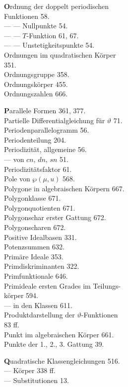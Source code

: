 
\noindent
\begin{minipage}[t]{0.48\textwidth}
\noindent \textbf{O}rdnung der doppelt periodischen\\
Funktionen 58.\\
--- --- Nullpunkte 54.\\
--- --- $T$-Funktion 61, 67.\\
--- --- Unstetigkeitspunkte 54.\\
Ordnungen im quadratischen Körper\\
351.\\
Ordnungsgruppe 358.\\
Ordnungskörper 455.\\
Ordnungszahlen 666.

\noindent \textbf{P}arallele Formen 361, 377.\\
Partielle Differentialgleichung für $\vartheta$ 71.\\
Periodenparallelogramm 56.\\
Periodenteilung 204.\\
Periodizität, allgemeine 56.\\
--- von $cn$, $dn$, $sn$ 51.\\
Periodizitätsfaktor 61.\\
Pole von $\wp(\mu,u)$ 568.\\
Polygone in algebraischen Körpern 667.\\
Polygonklasse 671.\\
Polygonquotienten 671.\\
Polygonschar erster Gattung 672.\\
Polygonscharen 672.\\
Positive Idealbasen 331.\\
Potenzsummen 632.\\
Primäre Ideale 353.\\
Primdiskriminanten 322.\\
Primfunktionale 646.\\
Primideale ersten Grades im Teilungs-\\
körper 594.\\
--- in den Klassen 611.\\
Produktdarstellung der $\vartheta$-Funktionen\\
83 ff.\\
Punkt im algebraischen Körper 661.\\
Punkte der 1., 2., 3. Gattung 39.

\noindent \textbf{Q}uadratische Klassengleichungen 516.\\
--- Körper 338 ff.\\
--- Substitutionen 13.


\end{minipage}
